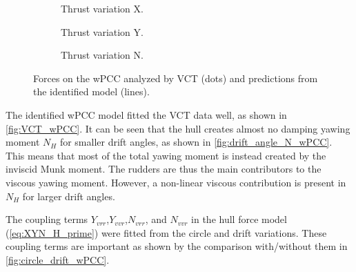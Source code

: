 \begin{figure}[H]
     \vfill
     \begin{subfigure}[b]{0.32\textwidth}
         \centering
         
        \caption{Thrust variation X.}
        \label{fig:Thrust variation_X_wPCC}
     \end{subfigure}
     \hfill
     \begin{subfigure}[b]{0.32\textwidth}
         \centering
         
        \caption{Thrust variation Y.}
        \label{fig:Thrust variation_Y_wPCC}
     \end{subfigure}
     \hfill
     \begin{subfigure}[b]{0.32\textwidth}
         \centering
         
        \caption{Thrust variation N.}
        \label{fig:Thrust variation_N_wPCC}
     \end{subfigure}
     
    \caption{Forces on the wPCC analyzed by VCT (dots) and predictions from the identified model (lines).}
    \label{fig:VCT_wPCC}
\end{figure}

\noindent The identified wPCC model fitted the VCT data well, as shown in \autoref{fig:VCT_wPCC}. 
It can be seen that the hull creates almost no damping yawing moment $N_H$ for smaller drift angles, as shown in \autoref{fig:drift_angle_N_wPCC}. This means that most of the total yawing moment is instead created by the inviscid Munk moment. The rudders are thus the main contributors to the viscous yawing moment. However, a non-linear viscous contribution is present in $N_H$ for larger drift angles. 

The coupling terms $Y_{vrr}$,$Y_{vvr}$,$N_{vrr}$, and $N_{vvr}$ in the hull force model (\autoref{eq:XYN_H_prime}) were fitted from the circle and drift variations. These coupling terms are important as shown by the comparison with/without them in \autoref{fig:circle_drift_wPCC}.


